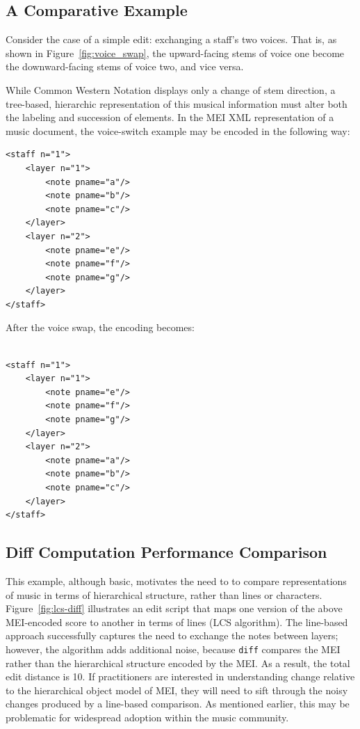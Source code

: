 \documentclass{article}
\newcommand{\code}[1]{\texttt{#1}}
\begin{document}
\subsection{A Comparative Example}
Consider the case of a simple edit: exchanging a staff's two voices.
That is, as shown in Figure~\ref{fig:voice_swap}, the upward-facing
stems of voice one become the downward-facing stems of voice two, and
vice versa.

While Common Western Notation displays only a change of stem
direction, a tree-based, hierarchic representation of this musical
information must alter both the labeling and succession of elements.
In the MEI XML representation of a music document, the voice-switch
example may be encoded in the following way: 

\break


\begin{verbatim}
<staff n="1"> 
    <layer n="1">
        <note pname="a"/>
        <note pname="b"/>
        <note pname="c"/>
    </layer>
    <layer n="2">
        <note pname="e"/>
        <note pname="f"/>
        <note pname="g"/>
    </layer>
</staff>
\end{verbatim}

After the voice swap, the encoding becomes:

\begin{verbatim}

<staff n="1">
    <layer n="1">
        <note pname="e"/>
        <note pname="f"/>
        <note pname="g"/>
    </layer>
    <layer n="2">
        <note pname="a"/>
        <note pname="b"/>
        <note pname="c"/>
    </layer>
</staff>
\end{verbatim}


\subsection{Diff Computation Performance Comparison}
This example, although basic, motivates the need to to compare representations of music in terms of 
hierarchical structure, rather than lines or characters. Figure~\ref{fig:lcs-diff} illustrates an edit script that maps one
version of the above MEI-encoded score to another in terms of lines (LCS algorithm).
The line-based approach successfully captures the need to exchange the
notes between layers; however, the algorithm adds additional noise,
because \code{diff} compares the MEI rather than the hierarchical
structure encoded by the MEI.  As a result, the total edit distance is
10.  If practitioners are interested in understanding change relative
to the hierarchical object model of MEI, they will need to sift
through the noisy changes produced by a line-based comparison.  As
mentioned earlier, this may be problematic for widespread adoption
within the music community.
\end{document}
